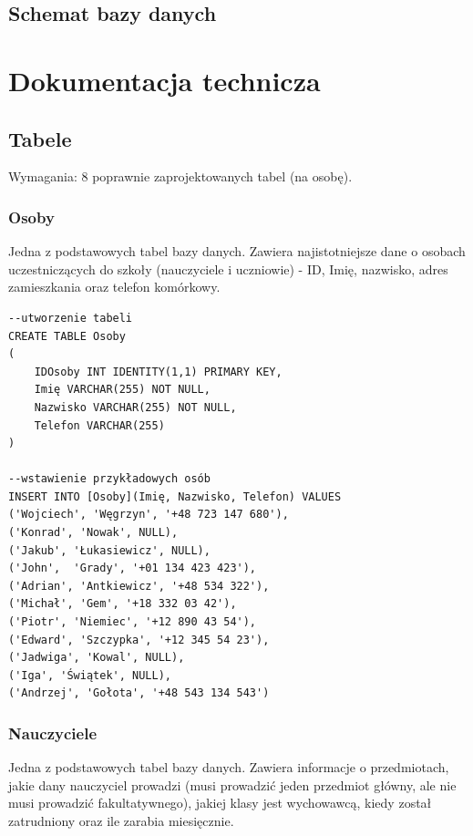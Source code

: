 \documentclass[60pt]{article}
\begin{document}
\subsection{Schemat bazy danych}

\newpage
\section{Dokumentacja technicza}

\subsection{Tabele}

Wymagania: 8 poprawnie zaprojektowanych tabel (na osobę).

\subsubsection{Osoby}
Jedna z podstawowych tabel bazy danych. Zawiera najistotniejsze dane o osobach uczestniczących do szkoły (nauczyciele i uczniowie) - ID, Imię, nazwisko, adres zamieszkania oraz telefon komórkowy.

\begin{verbatim}
--utworzenie tabeli
CREATE TABLE Osoby
(
	IDOsoby INT IDENTITY(1,1) PRIMARY KEY,
	Imię VARCHAR(255) NOT NULL,
	Nazwisko VARCHAR(255) NOT NULL,
	Telefon VARCHAR(255)
)

--wstawienie przykładowych osób
INSERT INTO [Osoby](Imię, Nazwisko, Telefon) VALUES
('Wojciech', 'Węgrzyn', '+48 723 147 680'),
('Konrad', 'Nowak', NULL),
('Jakub', 'Łukasiewicz', NULL),
('John',  'Grady', '+01 134 423 423'),
('Adrian', 'Antkiewicz', '+48 534 322'),
('Michał', 'Gem', '+18 332 03 42'),
('Piotr', 'Niemiec', '+12 890 43 54'), 
('Edward', 'Szczypka', '+12 345 54 23'), 
('Jadwiga', 'Kowal', NULL), 
('Iga', 'Świątek', NULL), 
('Andrzej', 'Gołota', '+48 543 134 543')

\end{verbatim}

\subsubsection{Nauczyciele}
 Jedna z podstawowych tabel bazy danych. Zawiera informacje o przedmiotach, jakie dany nauczyciel prowadzi (musi prowadzić jeden przedmiot główny, ale nie musi prowadzić fakultatywnego), jakiej klasy jest wychowawcą, kiedy został zatrudniony oraz ile zarabia miesięcznie.
 
\end{document}
